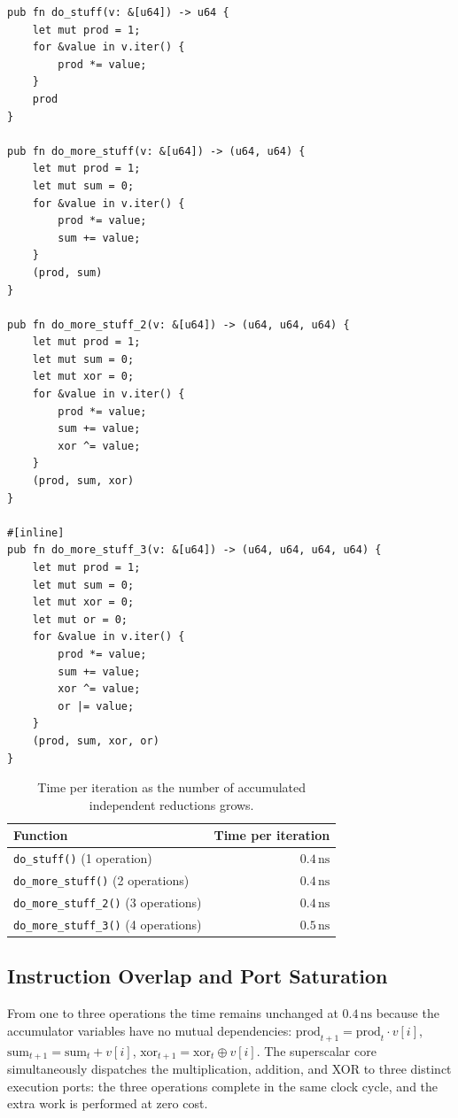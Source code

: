 \begin{lstlisting}[style=rustcode,caption={From a single reduction to four independent reductions per iteration.}]
pub fn do_stuff(v: &[u64]) -> u64 {
    let mut prod = 1;
    for &value in v.iter() {
        prod *= value;
    }
    prod
}

pub fn do_more_stuff(v: &[u64]) -> (u64, u64) {
    let mut prod = 1;
    let mut sum = 0;
    for &value in v.iter() {
        prod *= value;
        sum += value;
    }
    (prod, sum)
}

pub fn do_more_stuff_2(v: &[u64]) -> (u64, u64, u64) {
    let mut prod = 1;
    let mut sum = 0;
    let mut xor = 0;
    for &value in v.iter() {
        prod *= value;
        sum += value;
        xor ^= value;
    }
    (prod, sum, xor)
}

#[inline]
pub fn do_more_stuff_3(v: &[u64]) -> (u64, u64, u64, u64) {
    let mut prod = 1;
    let mut sum = 0;
    let mut xor = 0;
    let mut or = 0;
    for &value in v.iter() {
        prod *= value;
        sum += value;
        xor ^= value;
        or |= value;
    }
    (prod, sum, xor, or)
}
\end{lstlisting}

\begin{table}[htbp]
\centering
\small
\begin{tabular}{l r}
\toprule
\textbf{Function} & \textbf{Time per iteration} \\
\midrule
\texttt{do\_stuff()} (1 operation) & $0.4\,\text{ns}$ \\
\texttt{do\_more\_stuff()} (2 operations) & $0.4\,\text{ns}$ \\
\texttt{do\_more\_stuff\_2()} (3 operations) & $0.4\,\text{ns}$ \\
\texttt{do\_more\_stuff\_3()} (4 operations) & $0.5\,\text{ns}$ \\
\bottomrule
\end{tabular}
\caption{Time per iteration as the number of accumulated independent reductions grows.}
\label{tab:interleaving-arithmetic-en}
\end{table}

\subsection{Instruction Overlap and Port Saturation}

From one to three operations the time remains unchanged at $0.4\,\text{ns}$ because the accumulator variables have no mutual dependencies: $\text{prod}_{t+1} = \text{prod}_t \cdot v[i]$, $\text{sum}_{t+1} = \text{sum}_t + v[i]$, $\text{xor}_{t+1} = \text{xor}_t \oplus v[i]$. The superscalar core simultaneously dispatches the multiplication, addition, and XOR to three distinct execution ports: the three operations complete in the same clock cycle, and the extra work is performed at zero cost.

